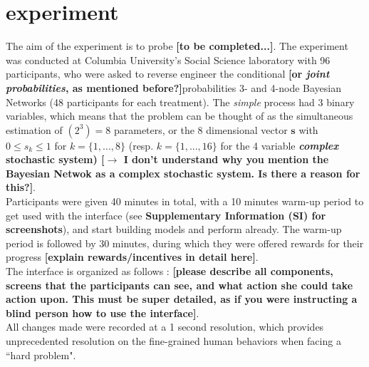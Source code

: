 \section{experiment}
The aim of the experiment is to probe {\bf [to be completed...]}. The experiment was conducted at Columbia University's Social Science laboratory with 96 participants, who were asked to reverse engineer the conditional {\bf [or {\it joint probabilities}, as mentioned before?]}probabilities 3- and 4-node Bayesian Networks (48 participants for each treatment). The {\it simple} process had 3 binary variables, which means that the problem can be thought of as the simultaneous estimation of $(2^3) = 8$ parameters, or the 8 dimensional vector $\mathbf{s}$ with $0 \leqslant s_k  \leqslant 1$ for $k = \{1,...,8\}$ (resp. $k = \{1,..., 16\}$ for the 4 variable {\bf {\it complex} stochastic system) [$\rightarrow$ I don't understand why you mention the Bayesian Netwok as a complex stochastic system. Is there a reason for this?]}.\\

Participants were given 40 minutes in total, with a 10 minutes warm-up period to get used with the interface (see {\bf Supplementary Information (SI) for screenshots}), and start building models and perform already. The warm-up period is followed by 30 minutes, during which they were offered rewards for their progress {\bf [explain rewards/incentives in detail here]}. \\

The interface is organized as follows : {\bf [please describe all components, screens that the participants can see, and what action she could take action upon. This must be super detailed, as if you were instructing a blind person how to use the interface]}.\\

All changes made were recorded at a 1 second resolution, which provides unprecedented resolution on the fine-grained human behaviors when facing a ``hard problem".\\